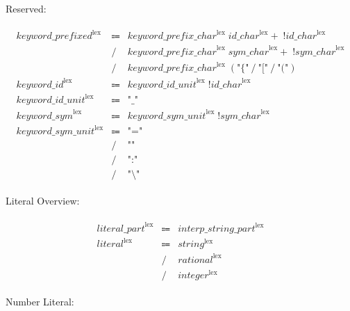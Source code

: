 Reserved:

\begin{align*}
    \begin{array}{rcll}
        \mathit{keyword\_prefixed}^\mathrm{lex}
        &\Coloneq &\mathit{keyword\_prefix\_char}^\mathrm{lex}\; \mathit{id\_char}^\mathrm{lex}{+}\; \mathop{!} \mathit{id\_char}^\mathrm{lex} \\
        &\mathrel{/} &\mathit{keyword\_prefix\_char}^\mathrm{lex}\; \mathit{sym\_char}^\mathrm{lex}{+}\; \mathop{!} \mathit{sym\_char}^\mathrm{lex} \\
        &\mathrel{/} &\mathit{keyword\_prefix\_char}^\mathrm{lex}\; (\texttt{"\{"} \mathrel{/} \texttt{"["} \mathrel{/} \texttt{"("}) \\
        \mathit{keyword\_id}^\mathrm{lex}
        &\Coloneq &\mathit{keyword\_id\_unit}^\mathrm{lex}\; \mathop{!} \mathit{id\_char}^\mathrm{lex} \\
        \mathit{keyword\_id\_unit}^\mathrm{lex}
        &\Coloneq &\texttt{"\_"} \\
        \mathit{keyword\_sym}^\mathrm{lex}
        &\Coloneq &\mathit{keyword\_sym\_unit}^\mathrm{lex}\; \mathop{!} \mathit{sym\_char}^\mathrm{lex} \\
        \mathit{keyword\_sym\_unit}^\mathrm{lex}
        &\Coloneq &\texttt{"="} \\
        &\mathrel{/} &\texttt{"\^{}"} \\
        &\mathrel{/} &\texttt{":"} \\
        &\mathrel{/} &\texttt{"\textbackslash"}
    \end{array}
\end{align*}

Literal Overview:

\begin{align*}
    \begin{array}{rcll}
        \mathit{literal\_part}^\mathrm{lex}
        &\Coloneq &\mathit{interp\_string\_part}^\mathrm{lex} \\
        \mathit{literal}^\mathrm{lex}
        &\Coloneq &\mathit{string}^\mathrm{lex} \\
        &\mathrel{/} &\mathit{rational}^\mathrm{lex} \\
        &\mathrel{/} &\mathit{integer}^\mathrm{lex}
    \end{array}
\end{align*}

Number Literal:

